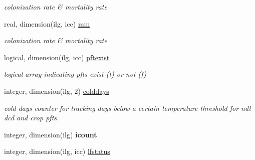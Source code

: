 \begin{DoxyCompactItemize}
\begin{DoxyCompactList}\small\item\em colonization rate \& mortality rate \end{DoxyCompactList}\item 
\hypertarget{structctem__statevars_1_1veg__gat_a4f406d320dbab403e7f24db145f509b9}{}real, dimension(ilg, icc) \hyperlink{structctem__statevars_1_1veg__gat_a4f406d320dbab403e7f24db145f509b9}{mm}\label{structctem__statevars_1_1veg__gat_a4f406d320dbab403e7f24db145f509b9}

\begin{DoxyCompactList}\small\item\em colonization rate \& mortality rate \end{DoxyCompactList}\item 
\hypertarget{structctem__statevars_1_1veg__gat_ac0ca3c2b4e99f1f11695ddc79f4af1d8}{}logical, dimension(ilg, icc) \hyperlink{structctem__statevars_1_1veg__gat_ac0ca3c2b4e99f1f11695ddc79f4af1d8}{pftexist}\label{structctem__statevars_1_1veg__gat_ac0ca3c2b4e99f1f11695ddc79f4af1d8}

\begin{DoxyCompactList}\small\item\em logical array indicating pfts exist (t) or not (f) \end{DoxyCompactList}\item 
\hypertarget{structctem__statevars_1_1veg__gat_a2792cfb0114cf9a14722a8688742a251}{}integer, dimension(ilg, 2) \hyperlink{structctem__statevars_1_1veg__gat_a2792cfb0114cf9a14722a8688742a251}{colddays}\label{structctem__statevars_1_1veg__gat_a2792cfb0114cf9a14722a8688742a251}

\begin{DoxyCompactList}\small\item\em cold days counter for tracking days below a certain temperature threshold for ndl dcd and crop pfts. \end{DoxyCompactList}\item 
\hypertarget{structctem__statevars_1_1veg__gat_a76468305f7fc177057cbf1588bf7a09e}{}integer, dimension(ilg) {\bfseries icount}\label{structctem__statevars_1_1veg__gat_a76468305f7fc177057cbf1588bf7a09e}

\item 
\hypertarget{structctem__statevars_1_1veg__gat_ae8d0dc8bbf1921db0851bfae95d74716}{}integer, dimension(ilg, icc) \hyperlink{structctem__statevars_1_1veg__gat_ae8d0dc8bbf1921db0851bfae95d74716}{lfstatus}\label{structctem__statevars_1_1veg__gat_ae8d0dc8bbf1921db0851bfae95d74716}


\end{DoxyCompactItemize}
